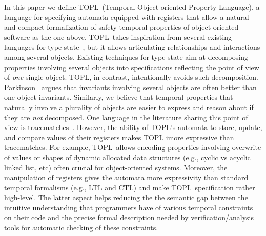 \documentclass{llncs} %
\newcommand{\TPL}{TOPL}
\begin{document}
In this paper we define  \TPL\ (Temporal Object-oriented Property Language), a language for specifying automata equipped with registers that allow a natural and compact formalization of safety temporal properties of
object-oriented software as the one above. 
\TPL \ takes inspiration from several existing  languages for type-state~\cite{strom1986,dblp:conf/oopsla/bierhoffa07,dblp:conf/oopsla/naeeml08,disney2011,ball2002}, but  it allows 
articulating  relationships and interactions among several objects.
Existing techniques for type-state aim at decomposing properties involving several objects into specifications reflecting the point of view of {\em one} single object. TOPL, in contrast,  intentionally avoids such decomposition.
Parkinson~\cite{parkinson-iwaco2007} argues that invariants involving several objects are often better than one-object invariants.  Similarly, we believe that temporal properties that naturally involve a plurality of objects are easier to express and reason about if they are \emph{not} decomposed. 
One language in the literature sharing this point of view is tracematches~\cite{DBLP:conf/oopsla/AllanACHKLMSST05}. 
%
However, the ability of \TPL's automata to store,  update, and compare values of their registers 
makes TOPL imore expressive than tracematches. For example, \TPL \ allows encoding properties involving overwrite of values or shapes of dynamic allocated data structures (e.g., cyclic vs acyclic linked list, etc) often crucial for object-oriented systems. Moreover, the manipulation of registers  gives the automata more expressivity than standard temporal formalisms (e.g., LTL and CTL) and make \TPL \ specification rather high-level. The latter aspect
helps reducing the the semantic gap between the intuitive understanding that programmers have of various temporal constraints on their code and the precise formal description needed by verification/analysis tools for automatic checking of these constraints.
\end{document}
